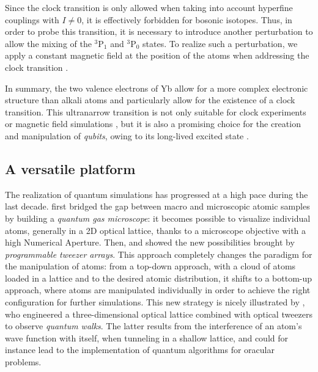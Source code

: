 \documentclass[11pt]{article}
\numberwithin{equation}{section}
\numberwithin{figure}{section}
\begin{document}
Since the clock transition is only allowed when taking into account hyperfine couplings with $I \ne 0$, it is effectively forbidden for bosonic isotopes. Thus, in order to probe this transition, it is necessary to introduce another perturbation to allow the mixing of the $^3$P$_1$ and $^3$P$_0$ states. To realize such a perturbation, we apply a constant magnetic field at the position of the atoms when addressing the clock transition \citep{2006_taichenachev}.

In summary, the two valence electrons of Yb allow for a more complex electronic structure than alkali atoms and particularly allow for the existence of a clock transition. This ultranarrow transition is not only suitable for clock experiments \citep{2015_ludlow} or magnetic field simulations \citep{2010_gerbier}, but it is also a promising choice for the creation and manipulation of \emph{qubits}, owing to its long-lived excited state \citep{2021_jenkins}.

\subsection{A versatile platform}
\label{sec:versatile_platform}

The realization of quantum simulations has progressed at a high pace during the last decade. \cite{2009_bakr} first bridged the gap between macro and microscopic atomic samples by building a \emph{quantum gas microscope}: it becomes possible to visualize individual atoms, generally in a 2D optical lattice, thanks to a microscope objective with a high Numerical Aperture. Then, \cite{2016_endres} and \cite{2016_barredo} showed the new possibilities brought by \emph{programmable tweezer arrays}. This approach completely changes the paradigm for the manipulation of atoms: from a top-down approach, with a cloud of atoms loaded in a lattice and  to the desired atomic distribution, it shifts to a bottom-up approach, where atoms are manipulated individually in order to achieve the right configuration for further simulations. This new strategy is nicely illustrated by \cite{2022_young}, who engineered a three-dimensional optical lattice combined with optical tweezers to observe \emph{quantum walks}. The latter results from the interference of an atom's wave function with itself, when tunneling in a shallow lattice, and could for instance lead to the implementation of quantum algorithms for oracular problems.
\end{document}
